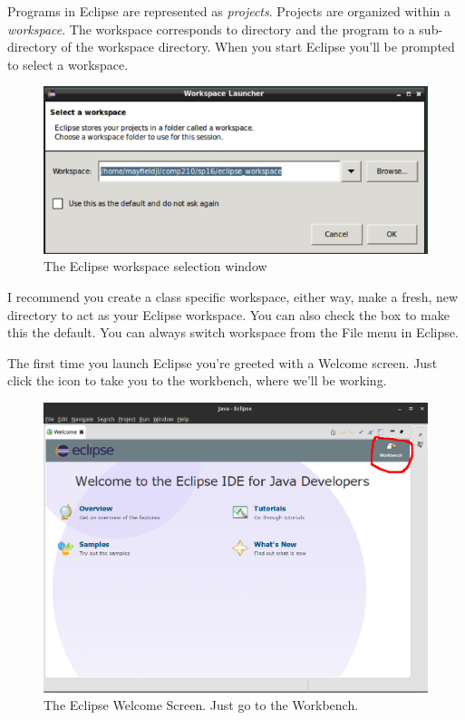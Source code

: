 \documentclass[nobib]{tufte-handout}
\begin{document}
Programs in Eclipse are represented as \textit{projects}. Projects are organized within a \textit{workspace}. The workspace corresponds to directory and the program to a sub-directory of the workspace directory. When you start Eclipse you'll be prompted to select a workspace.

\vspace{.1in}
\begin{center}
\begin{figure}
\includegraphics[scale=.5]{Eclipse-select-workspace.png}
\caption{The Eclipse workspace selection window}
\end{figure}
\end{center}
\vspace{.1in}


I recommend you create a class specific workspace, either way, make a fresh, new directory to act as your Eclipse workspace. You can also check the box to make this the default. You can always switch workspace from the File menu in Eclipse.

The first time you launch Eclipse you're greeted with a Welcome screen. Just click the icon to take you to the workbench, where we'll be working.

\vspace{.1in}
\begin{center}
\begin{figure}
\includegraphics[scale=.25]{Eclipse-Welcome.png}
\caption{The Eclipse Welcome Screen. Just go to the Workbench.}
\end{figure}
\end{center}
\vspace{.1in}
\end{document}
